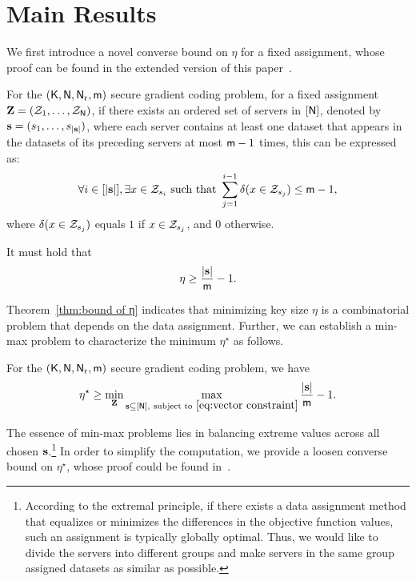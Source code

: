 \documentclass[conference,letterpaper]{IEEEtran}
\begin{document}
\section{Main Results}
\label{sec:main}
We first introduce a novel converse bound on $ \eta $ for a fixed assignment, {\red whose proof can be found in the extended version of this paper~\cite[Appendix ????]{GITHUB}.}
\begin{thm}
\label{thm:bound of η}
For the $({\sf K},{\sf N},{\sf N}_{\rm r}, {\sf m})$ secure gradient coding problem, for a fixed assignment \(\mathbf{Z} = ({\cal Z}_1, \ldots, {\cal Z}_{{\sf N}})\), if there exists an ordered set of servers in \([{\sf N}]\), denoted by \({\bf s} = (s_1, \ldots, s_{|{\bf s}|})\), where each server contains at least one dataset that appears in the datasets of its preceding servers at most \({\sf m} - 1\) times, this can be expressed as:
\begin{align}
\forall i \in [|{\bf s}|], \exists x \in {\cal Z}_{s_i} \text{ such that } \sum_{j=1}^{i-1} \delta(x \in {\cal Z}_{s_j}) \leq {\sf m} - 1, \label{eq:vector constraint}
\end{align}
where \(\delta(x \in {\cal Z}_{s_j})\) equals \(1\) if \(x \in {\cal Z}_{s_j}\), and \(0\) otherwise.

It must hold that
\begin{align}
\eta \geq \frac{|{\bf s}|}{{\sf m}}-1. \label{eq:converse lemma}
\end{align}
\end{thm}
Theorem~\ref{thm:bound of η} indicates that minimizing key size $\eta$ is a combinatorial problem that depends on the data assignment. 
Further, we can establish a min-max problem to characterize the minimum $\eta^{\star}$ as follows.
\begin{cor}
    For the $({\sf K},{\sf N},{\sf N}_{\rm r}, {\sf m})$ secure gradient coding problem, we have
    \begin{align}
\eta^{\star} \geq \min_{\mathbf{Z}}
\max_{{\bf s} \subseteq [{\sf N}], ~\text{subject to}~ \eqref{eq:vector constraint} } \frac{|{\bf s}|}{{\sf m}}-1. \label{eq:converse lemma}
\end{align}
\end{cor}

The essence of min-max problems lies in balancing extreme values across all chosen ${\bf s}$.\footnote{According to the extremal principle, if there exists a data assignment method that equalizes or minimizes the differences in the objective function values, such an assignment is typically globally optimal. Thus, we would like to divide the servers into different groups and make servers in the same group assigned datasets as similar as possible.} In order to simplify the computation, we provide a loosen converse bound on $\eta^{\star}$, {\red whose proof could be found in~\cite[Appendix ???]{GITHUB}.}
\end{document}
